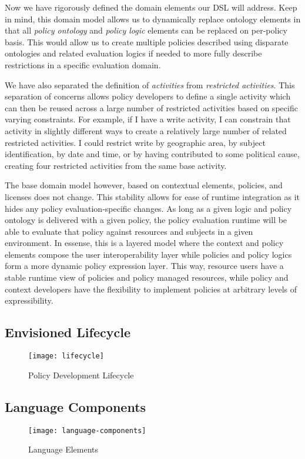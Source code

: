 Now we have rigorously defined the domain elements our DSL will address.  Keep in mind, this domain model allows us to dynamically replace ontology elements in that all \textit{policy ontology} and \textit{policy logic} elements can be replaced on per-policy basis.  This would allow us to create multiple policies described using disparate ontologies and related evaluation logics if needed to more fully describe restrictions in a specific evaluation domain.

We have also separated the definition of \textit{activities} from \textit{restricted activities}.  This separation of concerns allows policy developers to define a single activity which can then be reused across a large number of restricted activities based on specific varying constraints.  For example, if I have a write activity, I can constrain that activity in slightly different ways to create a relatively large number of related restricted activities.  I could restrict write by geographic area, by subject identification, by date and time, or by having contributed to some political cause, creating four restricted activities from the same base activity.

The base domain model however, based on contextual elements, policies, and licenses does not change.  This stability allows for ease of runtime integration as it hides any policy evaluation-specific changes.  As long as a given logic and policy ontology is delivered with a given policy, the policy evaluation runtime will be able to evaluate that policy against resources and subjects in a given environment.  In essense, this is a layered model where the context and policy elements compose the user interoperability layer while policies and policy logics form a more dynamic policy expression layer.  This way, resource users have a stable runtime view of policies and policy managed resources, while policy and context developers have the flexibility to implement policies at arbitrary levels of expressibility.

\subsection{Envisioned Lifecycle}

\begin{figure}[!t]
\centering
\texttt{[image: lifecycle]}
\caption{Policy Development Lifecycle}
\label{fig:model:lifecycle}
\end{figure}

\subsection{Language Components}

\begin{figure}[!t]
\centering
\texttt{[image: language-components]}
\caption{Language Elements}
\label{fig:model:language-components}
\end{figure}
